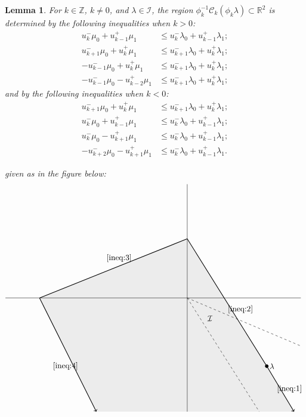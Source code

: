 \documentclass{amsart}
\newtheorem{lemma}[theorem]{Lemma}
\numberwithin{theorem}{section}
\newcommand{\cC}{\mathcal{C}}
\newcommand{\cI}{\mathcal{I}}
\newcommand{\RR}{\mathbb{R}}
\newcommand{\ZZ}{\mathbb{Z}}
\begin{document}
  \begin{lemma}
    \label{le:dominance inequalities}
    For $k\in\ZZ$, $k\ne0$, and $\lambda\in\cI$, the region $\phi_k^{-1}\cC_k(\phi_k\lambda)\subset\RR^2$ is determined by the following inequalities when $k>0$:
    \begin{align}
      \label{ineq:1} u_k^-\mu_0+u_{k-1}^+\mu_1 &\le u_k^-\lambda_0+u_{k-1}^+\lambda_1;\\
      \label{ineq:2} u_{k+1}^-\mu_0+u_k^+\mu_1 &\le u_{k+1}^-\lambda_0+u_k^+\lambda_1;\\
      \label{ineq:3} -u_{k-1}^-\mu_0+u_k^+\mu_1 &\le u_{k+1}^-\lambda_0+u_k^+\lambda_1;\\
      \label{ineq:4} -u_{k-1}^-\mu_0-u_{k-2}^+\mu_1 &\le u_{k+1}^-\lambda_0+u_k^+\lambda_1;
    \end{align}
    and by the following inequalities when $k<0$:
    \begin{align*}
      u_{k+1}^-\mu_0+u_k^+\mu_1 &\le u_{k+1}^-\lambda_0+u_k^+\lambda_1;\\
      u_k^-\mu_0+u_{k-1}^+\mu_1 &\le u_k^-\lambda_0+u_{k-1}^+\lambda_1;\\
      u_k^-\mu_0-u_{k+1}^+\mu_1 &\le u_k^-\lambda_0+u_{k-1}^+\lambda_1;\\
      -u_{k+2}^-\mu_0-u_{k+1}^+\mu_1 &\le u_k^-\lambda_0+u_{k-1}^+\lambda_1.
    \end{align*}
    
    given as in the figure below:
    \[
      \begin{tikzpicture}
        \filldraw[color=lightgray!30] (47/10,-5) --(3.5,-3) -- (0,26/10) -- (-26/4,0) -- (-16/4,-5);
        \draw[-] (-8,0) -- (5,0);
        \draw[-] (0,-5) -- (0,5);
        \draw[dashed] (0,0) -- (5,-2.113);
        \draw[dashed] (0,0) -- (3.17,-5);
        \node at (1,-0.9) {$\cI$};
        \draw[fill=black] (3.5,-3) circle (2pt);
        \node[right] at (3.5,-3) {$\lambda$};
        \draw[->,thick] (3.5,-3) -- (47/10,-5);
        \draw[-,thick] (3.5,-3) -- (0,26/10);
        \draw[-,thick] (0,26/10) -- (-26/4,0);
        \draw[->,thick] (-26/4,0) -- (-16/4,-5);
        \node at (4.5,-4) {\eqref{ineq:1}};
        \node at (2.34,-0.5) {\eqref{ineq:2}};
        \node at (-3,1.75) {\eqref{ineq:3}};
        \node at (-5.36,-3) {\eqref{ineq:4}};
      \end{tikzpicture}
    \]
  \end{lemma}
\end{document}
